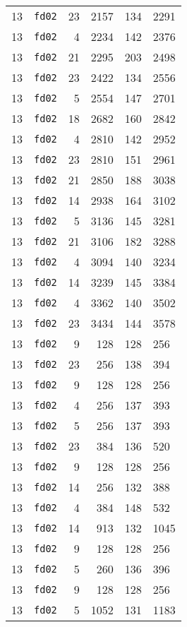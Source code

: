 \documentclass{article}
\begin{document}
\begin{table}[h!]
\begin{tabular}{llrrrl}
    13 & \texttt{fd02} & 23 & 2157 & 134 & 2291 \\
    13 & \texttt{fd02} & 4 & 2234 & 142 & 2376 \\
    13 & \texttt{fd02} & 21 & 2295 & 203 & 2498 \\
    13 & \texttt{fd02} & 23 & 2422 & 134 & 2556 \\
    13 & \texttt{fd02} & 5 & 2554 & 147 & 2701 \\
    13 & \texttt{fd02} & 18 & 2682 & 160 & 2842 \\
    13 & \texttt{fd02} & 4 & 2810 & 142 & 2952 \\
    13 & \texttt{fd02} & 23 & 2810 & 151 & 2961 \\
    13 & \texttt{fd02} & 21 & 2850 & 188 & 3038 \\
    13 & \texttt{fd02} & 14 & 2938 & 164 & 3102 \\
    13 & \texttt{fd02} & 5 & 3136 & 145 & 3281 \\
    13 & \texttt{fd02} & 21 & 3106 & 182 & 3288 \\
    13 & \texttt{fd02} & 4 & 3094 & 140 & 3234 \\
    13 & \texttt{fd02} & 14 & 3239 & 145 & 3384 \\
    13 & \texttt{fd02} & 4 & 3362 & 140 & 3502 \\
    13 & \texttt{fd02} & 23 & 3434 & 144 & 3578 \\
    13 & \texttt{fd02} & 9 & 128 & 128 & 256 \\
    13 & \texttt{fd02} & 23 & 256 & 138 & 394 \\
    13 & \texttt{fd02} & 9 & 128 & 128 & 256 \\
    13 & \texttt{fd02} & 4 & 256 & 137 & 393 \\
    13 & \texttt{fd02} & 5 & 256 & 137 & 393 \\
    13 & \texttt{fd02} & 23 & 384 & 136 & 520 \\
    13 & \texttt{fd02} & 9 & 128 & 128 & 256 \\
    13 & \texttt{fd02} & 14 & 256 & 132 & 388 \\
    13 & \texttt{fd02} & 4 & 384 & 148 & 532 \\
    13 & \texttt{fd02} & 14 & 913 & 132 & 1045 \\
    13 & \texttt{fd02} & 9 & 128 & 128 & 256 \\
    13 & \texttt{fd02} & 5 & 260 & 136 & 396 \\
    13 & \texttt{fd02} & 9 & 128 & 128 & 256 \\
    13 & \texttt{fd02} & 5 & 1052 & 131 & 1183 \\

\end{tabular}
\end{table}
\end{document}

